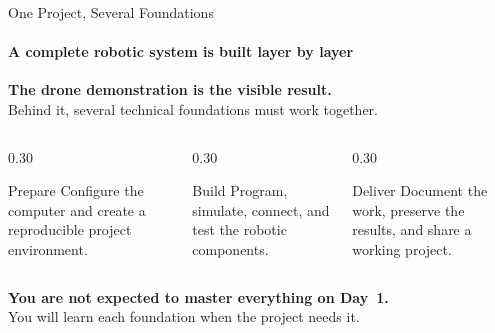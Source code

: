 \begin{frame}{One Project, Several Foundations}
\framesubtitle{A complete robotic system is built layer by layer}

\footnotesize

\begin{center}
    \large
    \textbf{The drone demonstration is the visible result.}\\[0.3em]
    \normalsize
    Behind it, several technical foundations must work together.
\end{center}

\pause

\begin{columns}[T,onlytextwidth]
    \begin{column}{0.30\textwidth}
        \begin{block}{Prepare}
            Configure the computer and create a reproducible project environment.
        \end{block}
    \end{column}
    \hfill
    \begin{column}{0.30\textwidth}
        \begin{block}{Build}
            Program, simulate, connect, and test the robotic components.
        \end{block}
    \end{column}
    \hfill
    \begin{column}{0.30\textwidth}
        \begin{block}{Deliver}
            Document the work, preserve the results, and share a working project.
        \end{block}
    \end{column}
\end{columns}

\pause


\begin{center}
    \textbf{You are not expected to master everything on Day~1.}\\
    You will learn each foundation when the project needs it.
\end{center}
\end{frame}


